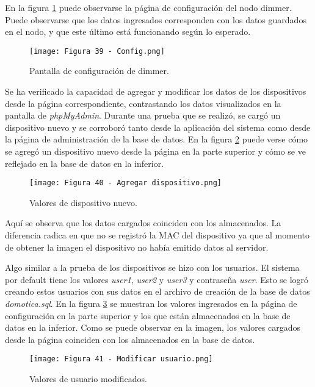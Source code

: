 En la figura \ref{fig:39} puede observarse la página de configuración del nodo dimmer. Puede observarse que los datos ingresados corresponden con los datos guardados en el nodo, y que este último está funcionando según lo esperado.

\begin{figure}[h]
\centering
\texttt{[image: Figura 39 - Config.png]}
\caption[Pantalla de configuración de dimmer]{Pantalla de configuración de dimmer.}
\label{fig:39}
\end{figure}

Se ha verificado la capacidad de agregar y modificar los datos de los dispositivos desde la página correspondiente, contrastando los datos visualizados en la pantalla de \textit{phpMyAdmin}. Durante una prueba que se realizó, se cargó un dispositivo nuevo y se corroboró tanto desde la aplicación del sistema como desde la página de administración de la base de datos. En la figura \ref{fig:40} puede verse cómo se agregó un dispositivo nuevo desde la página en la parte superior y cómo se ve reflejado en la base de datos en la inferior.

\newpage
\begin{figure}[h]
\centering
\texttt{[image: Figura 40 - Agregar dispositivo.png]}
\caption[Valores de dispositivo nuevo al agregar dispositivo]{Valores de dispositivo nuevo.}
\label{fig:40}
\end{figure}

Aquí se observa que los datos cargados coinciden con los almacenados. La diferencia radica en que no se registró la MAC del dispositivo ya que al momento de obtener la imagen el dispositivo no había emitido datos al servidor.

Algo similar a la prueba de los dispositivos se hizo con los usuarios. El sistema por default tiene los valores \textit{user1}, \textit{user2} y \textit{user3} y contraseña \textit{user}. Esto se logró creando estos usuarios con sus datos en el archivo de creación de la base de datos \textit{domotica.sql}. En la figura \ref{fig:41} se muestran los valores ingresados en la página de configuración en la parte superior y los que están almacenados en la base de datos en la inferior. Como se puede observar en la imagen, los valores cargados desde la página coinciden con los almacenados en la base de datos.

\begin{figure}[h]
\centering
\texttt{[image: Figura 41 - Modificar usuario.png]}
\caption[Valores de usuario modificados]{Valores de usuario modificados.}
\label{fig:41}
\end{figure}

